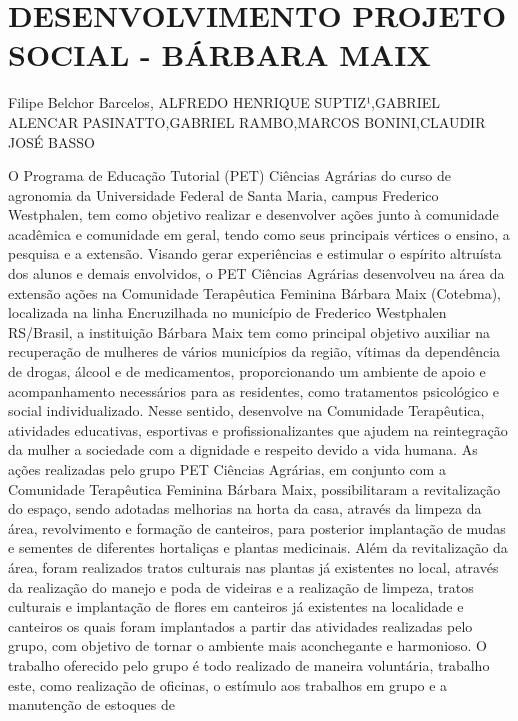 

\section{DESENVOLVIMENTO PROJETO SOCIAL - BÁRBARA MAIX}

Filipe Belchor Barcelos, ALFREDO HENRIQUE SUPTIZ¹,GABRIEL ALENCAR PASINATTO,GABRIEL RAMBO,MARCOS BONINI,CLAUDIR JOSÉ BASSO

O Programa de Educação Tutorial (PET) Ciências Agrárias do curso de agronomia da
Universidade Federal de Santa Maria, campus Frederico Westphalen, tem como objetivo realizar
e desenvolver ações junto à comunidade acadêmica e comunidade em geral, tendo como seus
principais vértices o ensino, a pesquisa e a extensão. Visando gerar experiências e estimular o
espírito altruísta dos alunos e demais envolvidos, o PET Ciências Agrárias desenvolveu na área
da extensão ações na Comunidade Terapêutica Feminina Bárbara Maix (Cotebma), localizada na
linha Encruzilhada no município de Frederico Westphalen RS/Brasil, a instituição Bárbara Maix
tem como principal objetivo auxiliar na recuperação de mulheres de vários municípios da região,
vítimas da dependência de drogas, álcool e de medicamentos, proporcionando um ambiente de
apoio e acompanhamento necessários para as residentes, como tratamentos psicológico e social
individualizado. Nesse sentido, desenvolve na Comunidade Terapêutica, atividades educativas,
esportivas e profissionalizantes que ajudem na reintegração da mulher a sociedade com a
dignidade e respeito devido a vida humana.
As ações realizadas pelo grupo PET Ciências Agrárias, em conjunto com a Comunidade
Terapêutica Feminina Bárbara Maix, possibilitaram a revitalização do espaço, sendo adotadas
melhorias na horta da casa, através da limpeza da área, revolvimento e formação de canteiros,
para posterior implantação de mudas e sementes de diferentes hortaliças e plantas medicinais.
Além da revitalização da área, foram realizados tratos culturais nas plantas já existentes no local,
através da realização do manejo e poda de videiras e a realização de limpeza, tratos culturais e
implantação de flores em canteiros já existentes na localidade e canteiros os quais foram
implantados a partir das atividades realizadas pelo grupo, com objetivo de tornar o ambiente
mais aconchegante e harmonioso.
O trabalho oferecido pelo grupo é todo realizado de maneira voluntária, trabalho este,
como realização de oficinas, o estímulo aos trabalhos em grupo e a manutenção de estoques de
